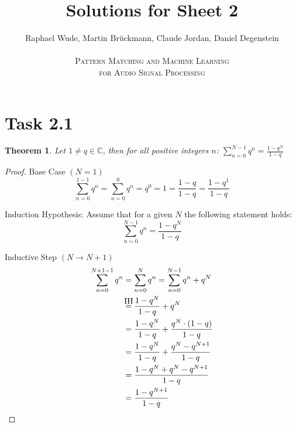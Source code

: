 \documentclass[12pt]{article}
\newcommand{\C}{\mathbb{C}}
\newtheorem{thm}{Theorem}
\newcommand\myeq{\stackrel{\mathclap{\normalfont\mbox{IH}}}{=}}
\begin{document}
\title{Solutions for Sheet 2}
\author{Raphael Wude, Martin Brückmann, Claude Jordan, Daniel Degenstein\\ \\
\textsc{Pattern Matching and Machine Learning} \\
\textsc{for Audio Signal Processing}}
\maketitle

\section*{Task 2.1}
\begin{thm} Let $1 \neq q \in \C$, then for all positive integers $n$: $\sum^{N-1}_{n=0}q^n = \frac{1-q^N}{1-q}$\end{thm}
\begin{proof}
Base Case $\left(N=1\right)$
$$\sum^{1-1}_{n=0}q^n
= \sum^{0}_{n=0}q^n
= q^0
= 1
= \frac{1-q}{1-q}
= \frac{1-q^1}{1-q}$$

Induction Hypothesis: Assume that for a given  $N$ the following statement holds:
$$\sum^{N-1}_{n=0}q^n = \frac{1-q^N}{1-q}$$

Inductive Step $\left(N \longrightarrow N+1\right)$
\begin{align*}
\sum^{N+1-1}_{n=0}q^n &= \sum^{N}_{n=0}q^n = \sum^{N-1}_{n=0}q^n + q^N \\
&\myeq \frac{1-q^N}{1-q} + q^N \\
&= \frac{1-q^N}{1-q} + \frac{q^N\cdot (1-q)}{1-q} \\
&= \frac{1-q^N}{1-q} + \frac{q^N-q^{N+1}}{1-q} \\
&= \frac{1-q^N+q^N-q^{N+1}}{1-q}\\
&= \frac{1-q^{N+1}}{1-q}
\end{align*}
\end{proof}

\end{document}
